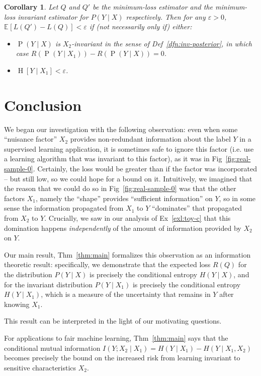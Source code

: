 \documentclass[12pt]{article}
\newcommand{\Ent}[1]{\operatorname{H}\left[#1\right]}
\newcommand{\E}[2][{}]{\mathbb{E}_{#1}\left[#2\right]}
\newcommand{\Prob}[1]{\operatorname{P}\left(#1\right)}
\newtheorem{cor}[thm]{Corollary}
\theoremstyle{definition}
\numberwithin{equation}{section}
\numberwithin{figure}{section}
\numberwithin{table}{section}
\begin{document}
\begin{cor}
    \label{cor:main}
    Let $Q$ and $Q'$ be the minimum-loss estimator and the minimum-loss invariant estimator for $P(Y\mid X)$ respectively. Then for any $\varepsilon>0$, $\E{L(Q')-L(Q)}<\varepsilon$ if (not necessarily only if) either:
    \begin{itemize}
        \item $\Prob{Y\mid X}$ is $X_2$-invariant in the sense of Def~\ref{dfn:inv-posterior}, in which case $R(\Prob{Y\mid X_1}) - R(\Prob{Y\mid X}) = 0$. 
        \item $\Ent{Y\mid X_1}<\varepsilon$.
    \end{itemize}
\end{cor}

\pagebreak
\section{Conclusion}
\label{sec:concl}

We began our investigation with the following observation: even when some ``nuisance factor'' $X_2$ provides non-redundant information about the label $Y$ in a supervised learning application, it is sometimes safe to ignore this factor (i.e. use a learning algorithm that was invariant to this factor), as it was in Fig~\ref{fig:real-sample-0}. Certainly, the loss would be greater than if the factor was incorporated -- but still low, so we could hope for a bound on it. Intuitively, we imagined that the reason that we could do so in Fig~\ref{fig:real-sample-0} was that the other factors $X_1$, namely the ``shape'' provides ``sufficient information'' on $Y$, so in some sense the information propagated from $X_1$ to $Y$ ``dominates'' that propagated from $X_2$ to $Y$. Crucially, we saw in our analysis of Ex~\ref{exl:toy-c} that this domination happens \emph{independently} of the amount of information provided by $X_2$ on $Y$. 

Our main result, Thm~\ref{thm:main} formalizes this observation as an information theoretic result: specifically, we demonstrate that the expected loss $R(Q)$ for the distribution $P(Y\mid X)$ is precisely the conditional entropy $H(Y\mid X)$, and for the invariant distribution $P(Y\mid X_1)$ is precisely the conditional entropy $H(Y\mid X_1)$, which is a measure of the uncertainty that remains in $Y$ after knowing $X_1$.

This result can be interpreted in the light of our motivating questions. 

For applications to fair machine learning, Thm~\ref{thm:main} says that the conditional mutual information $I(Y;X_2\mid X_1)=H(Y\mid X_1)-H(Y\mid X_1, X_2)$ becomes precisely the bound on the increased risk from learning invariant to sensitive characteristics $X_2$.
\end{document}
